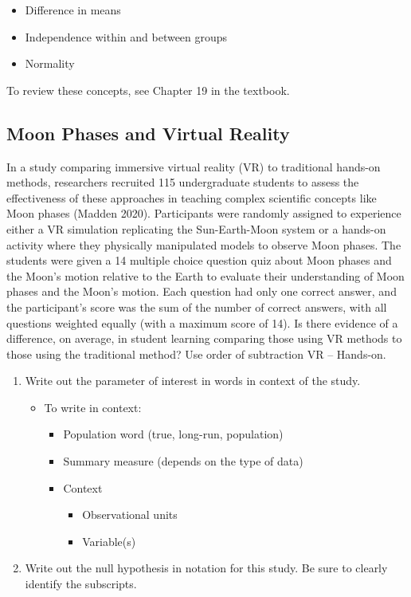 \documentclass[
]{report}
\begin{document}
\begin{itemize}
\item
  Difference in means
\item
  Independence within and between groups
\item
  Normality
\end{itemize}

To review these concepts, see Chapter 19 in the textbook.

\subsection{Moon Phases and Virtual Reality}\label{moon-phases-and-virtual-reality}

In a study comparing immersive virtual reality (VR) to traditional hands-on methods, researchers recruited 115 undergraduate students to assess the effectiveness of these approaches in teaching complex scientific concepts like Moon phases (Madden 2020). Participants were randomly assigned to experience either a VR simulation replicating the Sun-Earth-Moon system or a hands-on activity where they physically manipulated models to observe Moon phases. The students were given a 14 multiple choice question quiz about Moon phases and the Moon's motion relative to the Earth to evaluate their understanding of Moon phases and the Moon's motion. Each question had only one correct answer, and the participant's score was the sum of the number of correct answers, with all questions weighted equally (with a maximum score of 14). Is there evidence of a difference, on average, in student learning comparing those using VR methods to those using the traditional method? Use order of subtraction VR -- Hands-on.

\begin{enumerate}
\def\labelenumi{\arabic{enumi}.}
\item
  Write out the parameter of interest in words in context of the study.

  \begin{itemize}
  \item
    To write in context:

    \begin{itemize}
    \item
      Population word (true, long-run, population)
    \item
      Summary measure (depends on the type of data)
    \item
      Context

      \begin{itemize}
      \item
        Observational units
      \item
        Variable(s)
        \vspace{1in}
      \end{itemize}
    \end{itemize}
  \end{itemize}
\item
  Write out the null hypothesis in notation for this study. Be sure to clearly identify the subscripts.
\end{enumerate}
\end{document}

